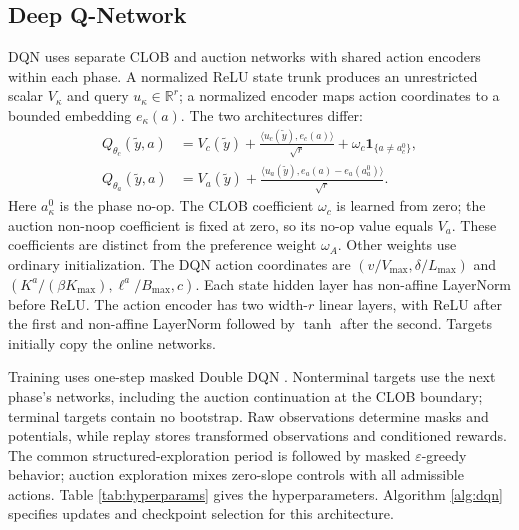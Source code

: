 \documentclass[11pt]{article}
\begin{document}
\subsection{Deep Q-Network}
\label{subsec:dqn}
DQN uses separate CLOB and auction networks with shared action encoders within each phase. A normalized ReLU state trunk produces an unrestricted scalar $V_\kappa$ and query $u_\kappa\in\mathbb R^r$; a normalized encoder maps action coordinates to a bounded embedding $e_\kappa(a)$. The two architectures differ:
\[
\begin{aligned}
Q_{\theta_c}(\tilde y,a)&=V_c(\tilde y)
+\frac{\langle u_c(\tilde y),e_c(a)\rangle}{\sqrt r}
+\omega_c\mathbf1_{\{a\ne a_c^0\}},\\
Q_{\theta_a}(\tilde y,a)&=V_a(\tilde y)
+\frac{\langle u_a(\tilde y),e_a(a)-e_a(a_a^0)\rangle}{\sqrt r}.
\end{aligned}
\]
Here $a_\kappa^0$ is the phase no-op. The CLOB coefficient $\omega_c$ is learned from zero; the auction non-noop coefficient is fixed at zero, so its no-op value equals $V_a$. These coefficients are distinct from the preference weight $\omega_A$. Other weights use ordinary initialization. The DQN action coordinates are $(v/V_{\max},\delta/L_{\max})$ and $(K^a/(\beta K_{\max}),\ell^a/B_{\max},c)$. Each state hidden layer has non-affine LayerNorm before ReLU. The action encoder has two width-$r$ linear layers, with ReLU after the first and non-affine LayerNorm followed by $\tanh$ after the second. Targets initially copy the online networks.\vspace{0.5em}

Training uses one-step masked Double DQN \cite{mnih2015human,van2016deep}. Nonterminal targets use the next phase's networks, including the auction continuation at the CLOB boundary; terminal targets contain no bootstrap. Raw observations determine masks and potentials, while replay stores transformed observations and conditioned rewards. The common structured-exploration period is followed by masked $\varepsilon$-greedy behavior; auction exploration mixes zero-slope controls with all admissible actions. Table \ref{tab:hyperparams} gives the hyperparameters. Algorithm \ref{alg:dqn} specifies updates and checkpoint selection for this architecture.
\end{document}
